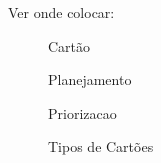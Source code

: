 Ver onde colocar:

\begin{figure}[H]
  \label{figura:github}
  \centering
  \caption{Cartão}
\end{figure}

\begin{figure}[H]
  \label{figura:github}
  \centering
  \caption{Planejamento}
\end{figure}

\begin{figure}[H]
  \label{figura:github}
  \centering
  \caption{Priorizacao}
\end{figure}

\begin{figure}[H]
  \label{figura:github}
  \centering
  \caption{Tipos de Cartões}
\end{figure}
